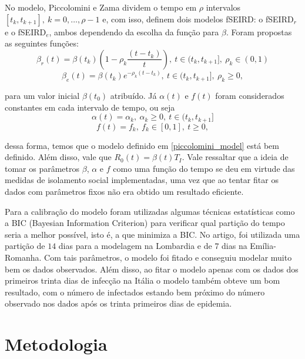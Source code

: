 \documentclass{article}
\begin{document}
No modelo, Piccolomini e Zama dividem o tempo em $\rho$ intervalos $[t_k, t_{k + 1}], ~k = 0, \dots, \rho -1$ e, com isso, definem dois modelos fSEIRD: o fSEIRD$_r$ e o fSEIRD$_e$, ambos dependendo da escolha da função para $\beta$. Foram propostas as seguintes funções:
\[\beta_r(t) = \beta(t_k)\left(1 - \rho_k\dfrac{(t - t_k)}{t}\right), ~t \in (t_k, t_{k + 1}], ~\rho_k \in (0, 1)\]
\[\beta_e(t) = \beta(t_k)e^{- \rho_k(t - t_k)}, ~t \in (t_k, t_{k + 1}], ~\rho_k \geq 0,\]

\noindent para um valor inicial $\beta(t_0)$ atribuído. Já $\alpha(t)$ e $f(t)$ foram considerados constantes em cada intervalo de tempo, ou seja
\[\alpha(t) = \alpha_k, ~\alpha_k \geq 0, ~t \in (t_k, t_{k + 1}]\]
\[f(t) = f_k, ~f_k \in [0, 1], ~t \geq 0,\]

\noindent dessa forma, temos que o modelo definido em \ref{piccolomini_model} está bem definido. Além disso, vale que $R_0(t) = \beta(t)T_I$. Vale ressaltar que a ideia de tomar os parâmetros $\beta$, $\alpha$ e $f$ como uma função do tempo se deu em virtude das medidas de isolamento social implementadas, uma vez que ao tentar fitar os dados com parâmetros fixos não era obtido um resultado eficiente.

Para a calibração do modelo foram utilizadas algumas técnicas estatísticas como a BIC (Bayesian Information Criterion) para verificar qual partição do tempo seria a melhor possível, isto é, a que minimiza a BIC. No artigo, foi utilizada uma partição de $14$ dias para a modelagem na Lombardia e de $7$ dias na Emília-Romanha. Com tais parâmetros, o modelo foi fitado e conseguiu modelar muito bem os dados observados. Além disso, ao fitar o modelo apenas com os dados dos primeiros trinta dias de infecção na Itália o modelo também obteve um bom resultado, com o número de infectados estando bem próximo do número observado nos dados após os trinta primeiros dias de epidemia.

\section{Metodologia}
\end{document}
